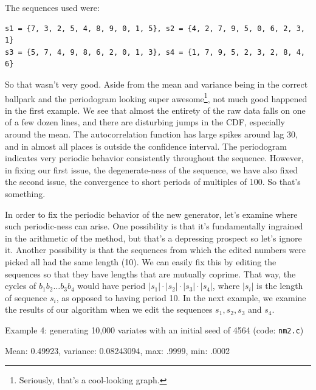 \documentclass[11pt]{article}
\begin{document}
The sequences used were:

\begin{verbatim}s1 = {7, 3, 2, 5, 4, 8, 9, 0, 1, 5}, s2 = {4, 2, 7, 9, 5, 0, 6, 2, 3, 1}
s3 = {5, 7, 4, 9, 8, 6, 2, 0, 1, 3}, s4 = {1, 7, 9, 5, 2, 3, 2, 8, 4, 6}\end{verbatim}

\newpage

So that wasn't very good.  Aside from the mean and variance being in the correct ballpark and the periodogram looking super awesome\footnote{Seriously, that's a cool-looking graph.}, not much good happened in the first example. We see that almost the entirety of the raw data falls on one of a few dozen lines, and there are disturbing jumps in the CDF, especially around the mean.  The autocorrelation function has large spikes around lag 30, and in almost all places is outside the confidence interval.  The periodogram indicates very periodic behavior consistently throughout the sequence.  However, in fixing our first issue, the degenerate-ness of the sequence, we have also fixed the second issue, the convergence to short periods of multiples of 100.  So that's something.

In order to fix the periodic behavior of the new generator, let's examine where such periodic-ness can arise.  One possibility is that it's fundamentally ingrained in the arithmetic of the method, but that's a depressing prospect so let's ignore it.  Another possibility is that the sequences from which the edited numbers were picked all had the same length (10).  We can easily fix this by editing the sequences so that they have lengths that are mutually coprime.  That way, the cycles of $b_1b_2\ldots b_3b_4$ would have period $|s_1|\cdot|s_2|\cdot|s_3|\cdot|s_4|$, where $|s_i|$ is the length of sequence $s_i$, as opposed to having period 10.  In the next example, we examine the results of our algorithm when we edit the sequences $s_1, s_2, s_3$ and $s_4$.

\newpage

Example 4: generating 10,000 variates with an initial seed of 4564 (code: \texttt{nm2.c})

Mean: 0.49923, variance: 0.08243094, max: .9999, min: .0002
\end{document}
